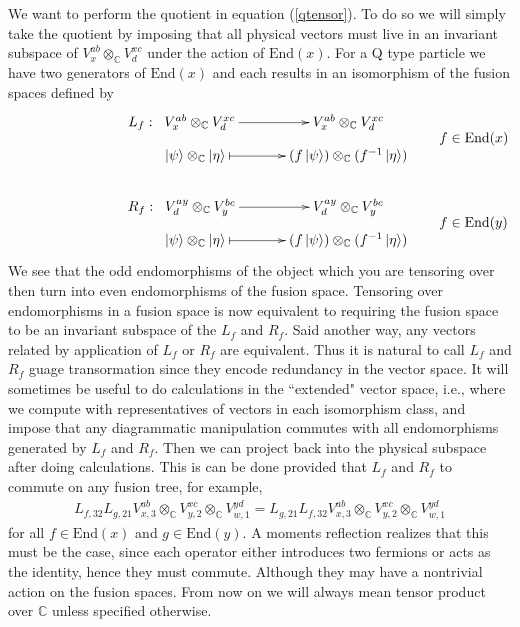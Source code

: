 \documentclass[12pt,a4paper]{article}
\newcommand{\tp}{\otimes}
\newcommand{\ket}[1]{\ensuremath{\left|#1\right\rangle}}
\begin{document}
We want to perform the quotient in equation (\ref{qtensor}).
To do so we will simply take the quotient by imposing that all physical vectors must live in an invariant subspace of $V^{ab}_x \tp_{\mathbb{C}} V^{xc}_d$ under the action of $\text{End}(x)$. 
For a Q type particle we have two generators of $\text{End}(x)$ and each results in an isomorphism of the fusion spaces defined by
\begin{align}
&\vcenter{\xymatrix @!0 @M=1mm @C=42mm{
 &L_f: \; \;V^{ab}_{x} \tp_{\mathbb{C}} V^{xc}_{d} \ar[r]            & V^{ab}_{x} \tp_{\mathbb{C}} V^{xc}_{d}  \\
		  &\;\;\;\;\;\;\; \ket{\psi}\tp_\mathbb{C} \ket{\eta}  \ar@{|->}[r] & (f\ket{\psi}) \tp_{\mathbb{C}} (f^{-1} \ket{\eta})  
		  }} \quad \quad f \in \text{End}(x)\\
		  \\		  
&		  \vcenter{\xymatrix @!0 @M=1mm @C=42mm{
		  &R_f: \; \;V^{ay}_{d} \tp_{\mathbb{C}} V^{bc}_{y} \ar[r]            & V^{ay}_{d} \tp_{\mathbb{C}} V^{bc}_{y} \\
		  &\;\;\;\;\;\;\; \ket{\psi}\tp_\mathbb{C} \ket{\eta}  \ar@{|->}[r] & (f\ket{\psi}) \tp_{\mathbb{C}} (f^{-1} \ket{\eta})
	}}	\quad \quad f \in \text{End}(y)
	\end{align}
We see that the odd endomorphisms of the object which you are tensoring over then turn into even endomorphisms of the fusion space. 
Tensoring over endomorphisms in a fusion space is now equivalent to requiring the fusion space to be an invariant subspace of the $L_f$ and $R_f$. 
Said another way, any vectors related by application of $L_f$ or $R_f$ are equivalent.
Thus it is natural to call $L_f$ and $R_f$ guage transormation since they encode redundancy in the vector space.
It will sometimes be useful to do calculations in the ``extended" vector space, i.e., where we compute with representatives of vectors in each isomorphism class, and impose that any diagrammatic manipulation commutes with all endomorphisms generated by $L_f$ and $R_f$. 
Then we can project back into the physical subspace after doing calculations. 
This is can be done provided that $L_f$ and $R_f$ to commute on any fusion tree, for example,
\begin{align}
L_{f, 32}L_{g,21} V^{ab}_{x,3} \tp_{\mathbb{C}} V^{xc}_{y,2} \tp_{\mathbb{C}} V^{yd}_{w,1} = L_{g,21} L_{f, 32} V^{ab}_{x,3} \tp_{\mathbb{C}} V^{xc}_{y,2} \tp_{\mathbb{C}} V^{yd}_{w,1} 
\end{align}
for all $f \in \text{End}(x)$ and $g \in \text{End}(y)$. 
A moments reflection realizes that this must be the case, since each operator either introduces two fermions or acts as the identity, hence they must commute. 
Although they may have a nontrivial action on the fusion spaces.
From now on we will always mean tensor product over $\mathbb{C}$ unless specified otherwise.
\end{document}
